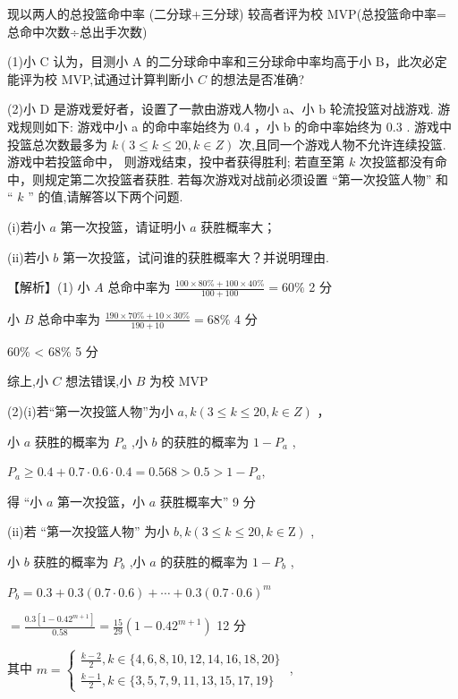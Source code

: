 \documentclass[10pt]{article}
\newcommand*\circled[1]{\tikz[baseline=(char.base)]{\node[shape=circle,draw,inner sep=1.5pt] (char) {\small #1};}}
\begin{document}
现以两人的总投篮命中率 (二分球+三分球) 较高者评为校 MVP(总投篮命中率=总命中次数÷总出手次数)

(1)小 C 认为，目测小 A 的二分球命中率和三分球命中率均高于小 B，此次必定能评为校 MVP,试通过计算判断小 \(C\) 的想法是否准确?

(2)小 D 是游戏爱好者，设置了一款由游戏人物小 a、小 b 轮流投篮对战游戏. 游戏规则如下: \circled{1} 游戏中小 a 的命中率始终为 0.4 ，小 b 的命中率始终为 0.3 .  \circled{2} 游戏中投篮总次数最多为 \(k\left( {3 \leq  k \leq  {20},k \in  Z}\right)\) 次,且同一个游戏人物不允许连续投篮.  \circled{3} 游戏中若投篮命中， 则游戏结束，投中者获得胜利; 若直至第 \(k\) 次投篮都没有命中，则规定第二次投篮者获胜. 若每次游戏对战前必须设置 “第一次投篮人物” 和 “ \(k\) ” 的值,请解答以下两个问题.

(i)若小 \(a\) 第一次投篮，请证明小 \(a\) 获胜概率大；

(ii)若小 \(b\) 第一次投篮，试问谁的获胜概率大？并说明理由.

【解析】(1) 小 \(A\) 总命中率为 \(\frac{{100} \times  {80}\%  + {100} \times  {40}\% }{{100} + {100}} = {60}\%\) 2 分

小 \(B\) 总命中率为 \(\frac{{190} \times  {70}\%  + {10} \times  {30}\% }{{190} + {10}} = {68}\%\) 4 分

60\% < 68\% 5 分

综上,小 \(C\) 想法错误,小 \(B\) 为校 MVP

(2)(i)若“第一次投篮人物”为小 \(a,k\left( {3 \leq  k \leq  {20},k \in  Z}\right)\) ，

小 \(a\) 获胜的概率为 \({P}_{a}\) ,小 \(b\) 的获胜的概率为 \(1 - {P}_{a}\) ,

\({P}_{a} \geq  {0.4} + {0.7} \cdot  {0.6} \cdot  {0.4} = {0.568} > {0.5} > 1 - {P}_{a},\)

得 “小 \(a\) 第一次投篮，小 \(a\) 获胜概率大” 9 分

(ii)若 “第一次投篮人物” 为小 \(b,k\left( {3 \leq  k \leq  {20},k \in  \mathrm{Z}}\right)\) ,

小 \(b\) 获胜的概率为 \({P}_{b}\) ,小 \(a\) 的获胜的概率为 \(1 - {P}_{b}\) ,

\({P}_{b} = {0.3} + {0.3}\left( {{0.7} \cdot  {0.6}}\right)  + \cdots  + {0.3}{\left( {0.7} \cdot  {0.6}\right) }^{m}\)

\(= \frac{{0.3}\left\lbrack  {1 - {0.42}^{m + 1}}\right\rbrack  }{0.58} = \frac{15}{29}\left( {1 - {0.42}^{m + 1}}\right)\) 12 分

其中 \(m = \left\{  \begin{array}{l} \frac{k - 2}{2},k \in  \{ 4,6,8,{10},{12},{14},{16},{18},{20}\} \\  \frac{k - 1}{2},k \in  \{ 3,5,7,9,{11},{13},{15},{17},{19}\}  \end{array}\right.\) ,
\end{document}
